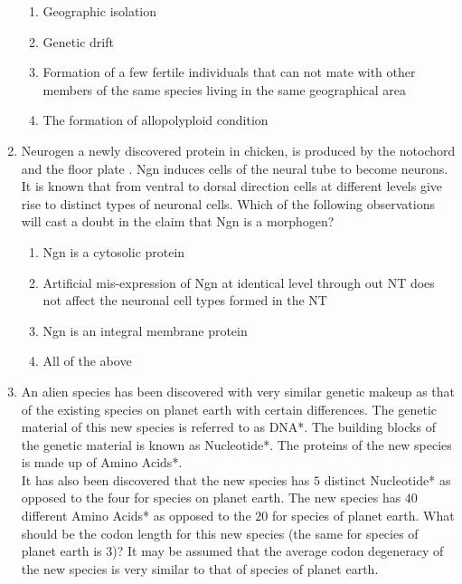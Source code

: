 \documentclass[journal,12pt,onecolumn]{IEEEtran}
\theoremstyle{remark}
\begin{document}
\begin{enumerate}
\hfill{}

\begin{enumerate}
\item Geographic isolation
\item Genetic drift
\item Formation of a few fertile individuals that can not mate with other members of the same species living in the same geographical area
\item The formation of allopolyploid condition
\end{enumerate}

\item Neurogen  a newly discovered protein in chicken, is produced by the notochord and the floor plate . Ngn induces cells of the neural tube  to become neurons. It is known that from ventral to dorsal direction cells at different levels give rise to distinct types of neuronal cells. Which of the following observations will cast a doubt in the claim that Ngn is a morphogen?

\hfill{}

\begin{enumerate}
\item Ngn is a cytosolic protein
\item Artificial mis-expression of Ngn at identical level through out NT does not affect the neuronal cell types formed in the NT
\item Ngn is an integral membrane protein
\item All of the above
\end{enumerate}

\item An alien species has been discovered with very similar genetic makeup as that of the existing species on planet earth with certain differences. The genetic material of this new species is referred to as DNA*. The building blocks of the genetic material is known as Nucleotide*. The proteins of the new species  is made up of Amino Acids*.\\

It has also been discovered that the new species has $5$ distinct Nucleotide* as opposed to the four for species on planet earth. The new species has $40$ different Amino Acids* as opposed to the $20$ for species of planet earth. What should be the codon length for this new species (the same for species of planet earth is $3$)? It may be assumed that the average codon degeneracy of the new species is very similar to that of species of planet earth.


\end{enumerate}
\end{document}
